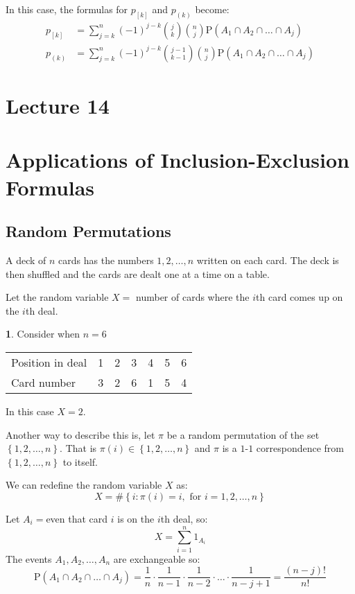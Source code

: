 \documentclass[english,12pt]{article}
\theoremstyle{plain}
\theoremstyle{definition}
\newtheorem*{example}{\protect\examplename}
\theoremstyle{definition} %
\providecommand{\examplename}{Example}
\newcommand{\brac}[1]{\left(#1\right)} %
\newcommand{\sqbrac}[1]{\left[#1\right]} %
\begin{document}
In this case, the formulas for $p_{\sqbrac{k}}$ and $p_{\brac{k}}$ become:
\begin{align*}
p_{\sqbrac{k}}&=\sum_{j=k}^n(-1)^{j-k}{j\choose k}{n\choose j}\text{P}(A_1\cap A_2\cap\ldots\cap A_j)\\
p_{\brac{k}}&=\sum_{j=k}^n(-1)^{j-k}{j-1\choose k-1}{n\choose j}\text{P}(A_1\cap A_2\cap\ldots\cap A_j)
\end{align*}

\section*{Lecture 14}
\section{Applications of Inclusion-Exclusion Formulas}
\subsection{Random Permutations}
A deck of $n$ cards has the numbers $1,2,\ldots,n$ written on each card.  The deck is then shuffled and the cards are dealt one at a time on a table.

Let the random variable $X=$ number of cards where the $i$th card comes up on the $i$th deal.

\begin{example}
Consider when $n=6$
\begin{center}
\begin{tabular}{lc|c|cc|c|c}
\cline{3-3}\cline{6-6}
Position in deal & 1 & 2 & 3 & 4 & 5 & 6\\
Card number & 3 & 2 & 6 & 1 & 5 & 4\\
\cline{3-3}\cline{6-6}
\end{tabular}
\end{center}
In this case $X=2$.
\end{example}

Another way to describe this is, let $\pi$ be a random permutation of the set $\left\{1,2,\ldots,n\right\}$.  That is $\pi(i)\in\left\{1,2,\ldots,n\right\}$ and $\pi$ is a $1$-$1$ correspondence from $\left\{1,2,\ldots,n\right\}$ to itself.

We can redefine the random variable $X$ as:
\[X=\#\left\{i:\pi(i)=i, \text{ for } i=1,2,\ldots,n\right\}\]

Let $A_i=$even that card $i$ is on the $i$th deal, so:
\[X=\sum\limits_{i=1}^n1_{A_i}\]
The events $A_1,A_2,\ldots,A_n$ are exchangeable so:
\[\text{P}(A_1\cap A_2\cap\ldots\cap A_j)=\frac{1}{n}\cdot\frac{1}{n-1}\cdot\frac{1}{n-2}\cdot\ldots\cdot\frac{1}{n-j+1}=\frac{(n-j)!}{n!}\]
\end{document}
